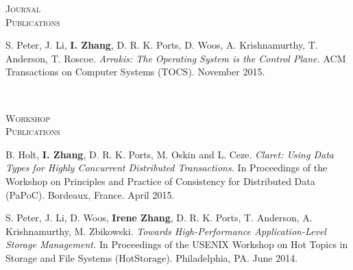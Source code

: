 \documentclass[10pt,times]{report}
\newlength{\sectiongap}
\newlength{\sectioncolwidth}
\newlength{\colgap}
\newlength{\stuffwidth}
\newenvironment{rtable}{
  \begin{minipage}{\textwidth}
  }{
  \end{minipage}
}
\newenvironment{rsection}[1]{
  \begin{minipage}[t]{\sectioncolwidth}
    \textsc{#1}
  \end{minipage}
  \hspace{\colgap}
  \begin{minipage}[t]{\stuffwidth}
  }{
    \removelastskip
  \end{minipage}
  \\[\sectiongap]
}
\begin{document}
\begin{rtable}
\begin{rsection}{Journal\\Publications}
    S. Peter, J. Li, \textbf{I. Zhang}, D. R. K. Ports, D. Woos,
    A. Krishnamurthy, T. Anderson, T. Roscoe.  \textit{Arrakis: The
      Operating System is the Control Plane.}  ACM Transactions on
    Computer Systems (TOCS). November 2015.\\
  \end{rsection}


  
  \begin{rsection}{Workshop\\Publications}
    B. Holt, \textbf{I. Zhang}, D. R. K. Ports, M. Oskin and L. Ceze.
    \textit{Claret: Using Data Types for Highly Concurrent Distributed
      Transactions.} In Proceedings of the Workshop on Principles and
    Practice of Consistency for Distributed Data (PaPoC).  Bordeaux,
    France. April 2015.\\\vspace{-0.5em}


    S. Peter, J. Li, D. Woos, \textbf{Irene Zhang}, D. R. K. Ports,
    T. Anderson, A. Krishnamurthy, M. Zbikowski. \textit{Towards
      High-Performance Application-Level Storage Management.} In
    Proceedings of the USENIX Workshop on Hot Topics in Storage and
    File Systems (HotStorage). Philadelphia, PA. June
    2014.\\\vspace{-0.5em}
  \end{rsection}
\end{rtable}
\end{document}
